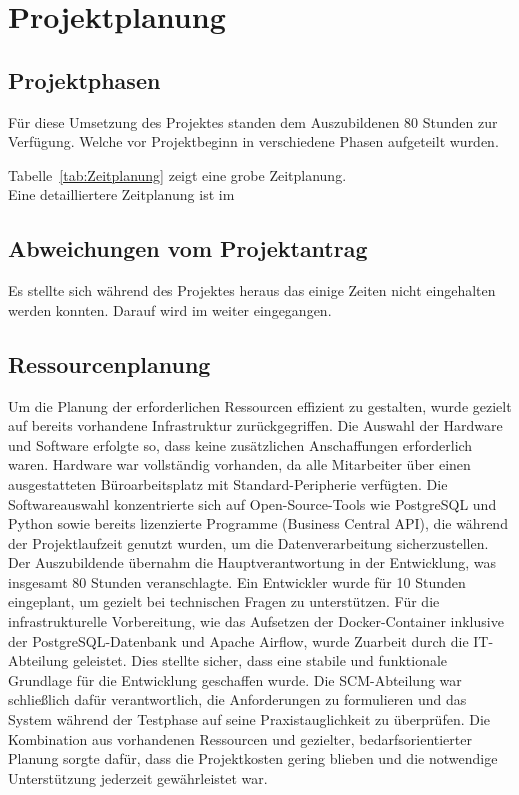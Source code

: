 \section{Projektplanung} 

\subsection{Projektphasen}
\label{sec:Projektphasen}
Für diese Umsetzung des Projektes standen dem Auszubildenen 80 Stunden zur Verfügung. 
Welche vor Projektbeginn in verschiedene Phasen aufgeteilt wurden. 

Tabelle~\ref{tab:Zeitplanung} zeigt eine grobe Zeitplanung.
\\

Eine detailliertere Zeitplanung ist im 

\clearpage


\subsection{Abweichungen vom Projektantrag}
\label{sec:Abweichung Projektantrag}
Es stellte sich während des Projektes heraus das einige Zeiten nicht eingehalten werden konnten. 
Darauf wird im  weiter eingegangen.


\subsection{Ressourcenplanung}
\label{sec:Ressourcenplanung}
Um die Planung der erforderlichen Ressourcen effizient zu gestalten, wurde gezielt auf bereits vorhandene Infrastruktur zurückgegriffen. Die Auswahl der Hardware und Software erfolgte so, dass keine zusätzlichen Anschaffungen erforderlich waren. Hardware war vollständig vorhanden, da alle Mitarbeiter über einen ausgestatteten Büroarbeitsplatz mit Standard-Peripherie verfügten. Die Softwareauswahl konzentrierte sich auf Open-Source-Tools wie PostgreSQL und Python sowie bereits lizenzierte Programme (Business Central API), die während der Projektlaufzeit genutzt wurden, um die Datenverarbeitung sicherzustellen.
Der Auszubildende übernahm die Hauptverantwortung in der Entwicklung, was insgesamt 80 Stunden veranschlagte. Ein Entwickler wurde für 10 Stunden eingeplant, um gezielt bei technischen Fragen zu unterstützen. Für die infrastrukturelle Vorbereitung, wie das Aufsetzen der Docker-Container inklusive der PostgreSQL-Datenbank und Apache Airflow, wurde Zuarbeit durch die IT-Abteilung geleistet. Dies stellte sicher, dass eine stabile und funktionale Grundlage für die Entwicklung geschaffen wurde.
Die SCM-Abteilung war schließlich dafür verantwortlich, die Anforderungen zu formulieren und das System während der Testphase auf seine Praxistauglichkeit zu überprüfen. Die Kombination aus vorhandenen Ressourcen und gezielter, bedarfsorientierter Planung sorgte dafür, dass die Projektkosten gering blieben und die notwendige Unterstützung jederzeit gewährleistet war.


